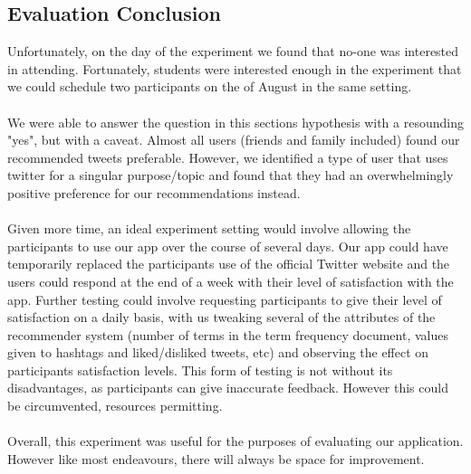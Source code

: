 \documentclass{article}
\begin{document}
\subsection{Evaluation Conclusion} %
%
%
Unfortunately, on the day of the experiment we found that no-one was interested in attending. Fortunately, students were interested enough in the experiment that we could schedule two participants on the  of August in the same setting. 
\\\\
We were able to answer the question in this sections hypothesis with a resounding "yes", but with a caveat. Almost all users (friends and family included) found our recommended tweets preferable. However, we identified a type of user that uses twitter for a singular purpose/topic and found that they had an overwhelmingly positive preference for our recommendations instead.
\\\\
Given more time, an ideal experiment setting would involve allowing the participants to use our app over the course of several days. Our app could have temporarily replaced the participants use of the official Twitter website and the users could respond at the end of a week with their level of satisfaction with the app. Further testing could involve requesting participants to give their level of satisfaction on a daily basis, with us tweaking several of the attributes of the recommender system (number of terms in the term frequency document, values given to hashtags and liked/disliked tweets, etc) and observing the effect on participants satisfaction levels. This form of testing is not without its disadvantages, as participants can give inaccurate feedback. However this could be circumvented, resources permitting.
\\\\
Overall, this experiment was useful for the purposes of evaluating our application. However like most endeavours, there will always be space for improvement. 
\end{document}
